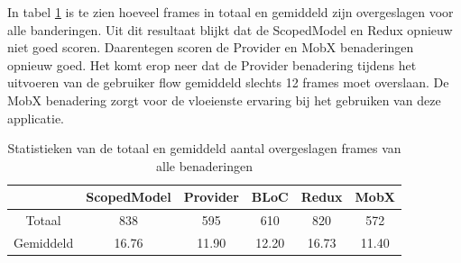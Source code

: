 In tabel \ref{table:experiment-skipped-frames} is te zien hoeveel frames in totaal en gemiddeld zijn overgeslagen voor alle banderingen. \newline \newline
Uit dit resultaat blijkt dat de ScopedModel en Redux opnieuw niet goed scoren. Daarentegen scoren de Provider en MobX benaderingen opnieuw goed. Het komt erop neer dat de Provider benadering tijdens het uitvoeren van de gebruiker flow gemiddeld slechts 12 frames moet overslaan. De MobX benadering zorgt voor de vloeienste ervaring bij het gebruiken van deze applicatie.

\begin{table}[H]
    \centering
    \begin{tabular}{c|c|c|c|c|c}
        & \textbf{ScopedModel} & \textbf{Provider} & \textbf{BLoC} & \textbf{Redux} & \textbf{MobX} \\ \hline
        Totaal      &  838   &  595     &  610     &  820    &  572        \\ \hline
        Gemiddeld   &  16.76    &  11.90   &  12.20   &  16.73  &  11.40        \\ 
    \end{tabular}
    \caption{Statistieken van de totaal en gemiddeld aantal overgeslagen frames van alle benaderingen}
    \label{table:experiment-skipped-frames}
\end{table}

